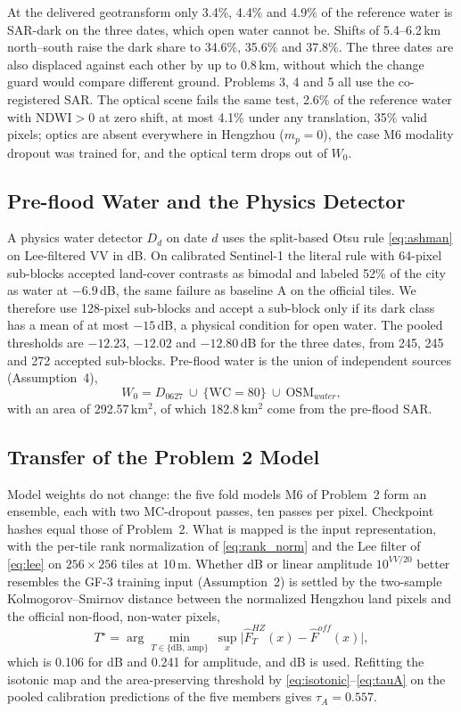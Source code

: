 At the delivered geotransform only 3.4\%, 4.4\% and 4.9\% of the reference water is SAR-dark on the three dates, which open water cannot be. Shifts of 5.4--6.2\,km north--south raise the dark share to 34.6\%, 35.6\% and 37.8\%. The three dates are also displaced against each other by up to 0.8\,km, without which the change guard would compare different ground. Problems 3, 4 and 5 all use the co-registered SAR. The optical scene fails the same test, 2.6\% of the reference water with $\mathrm{NDWI}>0$ at zero shift, at most 4.1\% under any translation, 35\% valid pixels; optics are absent everywhere in Hengzhou ($m_p=0$), the case M6 modality dropout was trained for, and the optical term drops out of $W_0$.

\subsection{Pre-flood Water and the Physics Detector}

A physics water detector $D_d$ on date $d$ uses the split-based Otsu rule \eqref{eq:ashman} on Lee-filtered VV in dB. On calibrated Sentinel-1 the literal rule with 64-pixel sub-blocks accepted land-cover contrasts as bimodal and labeled 52\% of the city as water at $-6.9$\,dB, the same failure as baseline A on the official tiles. We therefore use 128-pixel sub-blocks and accept a sub-block only if its dark class has a mean of at most $-15$\,dB, a physical condition for open water. The pooled thresholds are $-12.23$, $-12.02$ and $-12.80$\,dB for the three dates, from 245, 245 and 272 accepted sub-blocks. Pre-flood water is the union of independent sources (Assumption~4),
\begin{equation}
W_0=D_{0627}\ \cup\ \{\mathrm{WC}=80\}\ \cup\ \mathrm{OSM}_{water},
\label{eq:W0}
\end{equation}
with an area of 292.57\,km$^2$, of which 182.8\,km$^2$ come from the pre-flood SAR.

\subsection{Transfer of the Problem 2 Model}

Model weights do not change: the five fold models M6 of Problem~2 form an ensemble, each with two MC-dropout passes, ten passes per pixel. Checkpoint hashes equal those of Problem~2. What is mapped is the input representation, with the per-tile rank normalization of \eqref{eq:rank_norm} and the Lee filter of \eqref{eq:lee} on $256\times256$ tiles at 10\,m. Whether dB or linear amplitude $10^{VV/20}$ better resembles the GF-3 training input (Assumption~2) is settled by the two-sample Kolmogorov--Smirnov distance between the normalized Hengzhou land pixels and the official non-flood, non-water pixels,
\begin{equation}
T^\star=\arg\min_{T\in\{\mathrm{dB},\,\mathrm{amp}\}}\ \sup_x\Big|\hat F^{HZ}_{T}(x)-\hat F^{off}(x)\Big|,
\label{eq:ks}
\end{equation}
which is 0.106 for dB and 0.241 for amplitude, and dB is used. Refitting the isotonic map and the area-preserving threshold by \eqref{eq:isotonic}--\eqref{eq:tauA} on the pooled calibration predictions of the five members gives $\tau_A=0.557$.


